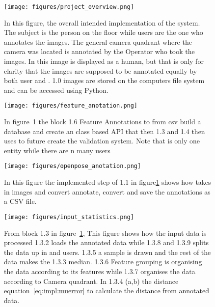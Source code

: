 \begin{figure}[ht]
\begin{center}
    \texttt{[image: figures/project\_overview.png]}
\end{center}
\caption[Project Overview]{In this figure, the overall intended implementation of the system. The subject is the person on the floor while users are the one who annotates the images. The general camera quadrant where the camera was located is annotated by the Operator who took the images. In this image \openpose is displayed as a human, but that is only for clarity that the images are supposed to be annotated equally by both user and \openpose. 1.0 images are stored on the computers file system and can be accessed using Python.}
\label{fig:project_overview}
\end{figure}


\begin{figure}[ht]
\begin{center}
    \texttt{[image: figures/feature\_anotation.png]}
\end{center}
\caption[1.6 feature anotations]{In figure~\ref{fig:project_overview} the block 1.6 Feature Annotations to from \ac{csv} build a database and create an class based API that then 1.3 and 1.4 then uses to future create the validation system. Note that \openpose{ } is only one entity while there are n many users}
\label{fig:1.6.feature_antotation}
\end{figure}



\begin{figure}[ht]
\begin{center}
    \texttt{[image: figures/openpose\_anotation.png]}
\end{center}
\caption[1.1 OpenPose anotations]{In this figure the implemented step of 1.1 in figure\ref{fig:project_overview} shows how \openpose takes in images and convert annotate, convert and save the annotations as a CSV file.}
\label{fig:1.1.openpose_anotation}
\end{figure}




\begin{figure}[ht]
\begin{center}
    \texttt{[image: figures/input\_statistics.png]}
\end{center}
\caption[1.3 Input statistics]{From block 1.3 in figure~\ref{fig:project_overview}, This figure shows how the input data is processed 1.3.2 loads the annotated data while 1.3.8 and 1.3.9 splits the data up in \openpose and users. 1.3.5 a sample is drawn and the rest of the data makes the 1.3.3 median. 1.3.6 Feature grouping is organising the data according to its features while 1.3.7 organises the data according to Camera quadrant. In 1.3.4 (a,b) the distance equation~\ref{eq:impl:muerror} to calculate the distance from annotated data.}
\label{fig:1.3_input_statistics}
\end{figure}

